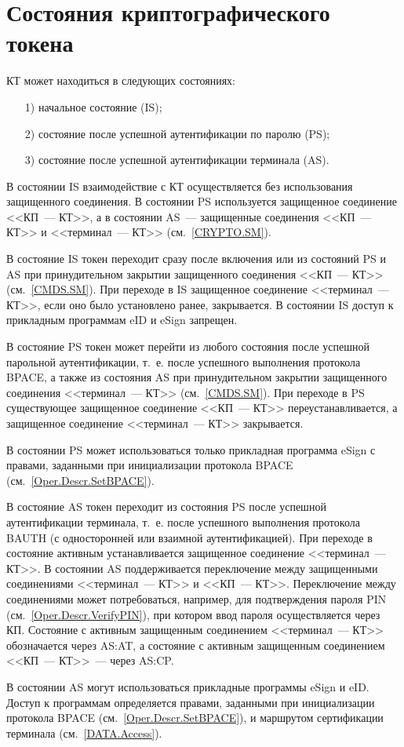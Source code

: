 \chapter{Состояния криптографического токена}\label{STATES}

КТ может находиться в следующих состояниях:
%
\begin{itemize}
\item[1)]
начальное состояние (IS);
\item[2)]
состояние после успешной аутентификации по паролю (PS);
\item[3)]
состояние после успешной аутентификации терминала (AS).
\end{itemize}

В состоянии IS взаимодействие с КТ осуществляется без использования 
защищенного соединения. В состоянии PS используется 
защищенное соединение <<КП~--- КТ>>, 
а в состоянии AS~--- защищенные соединения <<КП~--- КТ>> 
и <<терминал~--- КТ>> (см.~\ref{CRYPTO.SM}).

В состояние IS токен переходит сразу после включения 
или из состояний PS и AS при принудительном закрытии защищенного соединения 
<<КП~--- КТ>> (см.~\ref{CMDS.SM}). 
%
При переходе в IS защищенное соединение <<терминал~--- КТ>>, 
если оно было установлено ранее, закрывается.
В состоянии IS доступ к прикладным программам eID и eSign запрещен.

В состояние PS токен может перейти из любого состояния 
после успешной парольной аутентификации, 
т.~е. после успешного выполнения протокола BPACE,
а также из состояния AS при принудительном закрытии 
защищенного соединения <<терминал~--- КТ>> (см.~\ref{CMDS.SM}).
%
При переходе в PS существующее защищенное соединение <<КП~--- КТ>>  
переустанавливается, а защищенное соединение <<терминал~--- КТ>> 
закрывается.

В состоянии PS может использоваться только прикладная программа eSign
с правами, заданными при инициализации протокола BPACE 
(см.~\ref{Oper.Descr.SetBPACE}).

В состояние AS токен переходит из состояния PS 
после успешной аутентификации терминала, т.~е. 
после успешного выполнения протокола BAUTH 
(с односторонней или взаимной аутентификацией).
%
При переходе в состояние активным устанавливается 
защищенное соединение <<терминал~--- КТ>>.
В состоянии AS поддерживается переключение 
между защищенными соединениями <<терминал~--- КТ>> и <<КП~--- КТ>>.
Переключение между соединениями может потребоваться, 
например, для подтверждения пароля PIN (см.~\ref{Oper.Descr.VerifyPIN}), 
при котором ввод пароля осуществляется через КП. 
Состояние с активным защищенным соединением <<терминал~--- КТ>>
обозначается через AS:AT, 
а состояние с активным защищенным соединением <<КП~--- КТ>>~--- 
через AS:CP. 

В состоянии AS могут использоваться прикладные программы eSign и eID.
Доступ к программам определяется правами, 
заданными при инициализации протокола BPACE (см.~\ref{Oper.Descr.SetBPACE}), 
и маршрутом сертификации терминала (см.~\ref{DATA.Access}).


